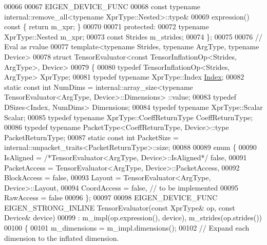 \begin{DoxyCode}
00066 
00067     EIGEN\_DEVICE\_FUNC
00068     \textcolor{keyword}{const} \textcolor{keyword}{typename} internal::remove\_all<typename XprType::Nested>::type&
00069     expression()\textcolor{keyword}{ const }\{ \textcolor{keywordflow}{return} m\_xpr; \}
00070 
00071   \textcolor{keyword}{protected}:
00072     \textcolor{keyword}{typename} XprType::Nested m\_xpr;
00073     \textcolor{keyword}{const} Strides m\_strides;
00074 \};
00075 
00076 \textcolor{comment}{// Eval as rvalue}
00077 \textcolor{keyword}{template}<\textcolor{keyword}{typename} Str\textcolor{keywordtype}{id}es, \textcolor{keyword}{typename} ArgType, \textcolor{keyword}{typename} Device>
00078 \textcolor{keyword}{struct }TensorEvaluator<const TensorInflationOp<Strides, ArgType>, Device>
00079 \{
00080   \textcolor{keyword}{typedef} TensorInflationOp<Strides, ArgType> XprType;
00081   \textcolor{keyword}{typedef} \textcolor{keyword}{typename} XprType::Index \hyperlink{namespace_eigen_a62e77e0933482dafde8fe197d9a2cfde}{Index};
00082   \textcolor{keyword}{static} \textcolor{keyword}{const} \textcolor{keywordtype}{int} NumDims = internal::array\_size<typename TensorEvaluator<ArgType, Device>::Dimensions>
      ::value;
00083   \textcolor{keyword}{typedef} DSizes<Index, NumDims> Dimensions;
00084   \textcolor{keyword}{typedef} \textcolor{keyword}{typename} XprType::Scalar Scalar;
00085   \textcolor{keyword}{typedef} \textcolor{keyword}{typename} XprType::CoeffReturnType CoeffReturnType;
00086   \textcolor{keyword}{typedef} \textcolor{keyword}{typename} PacketType<CoeffReturnType, Device>::type PacketReturnType;
00087   \textcolor{keyword}{static} \textcolor{keyword}{const} \textcolor{keywordtype}{int} PacketSize = internal::unpacket\_traits<PacketReturnType>::size;
00088 
00089   \textcolor{keyword}{enum} \{
00090     IsAligned = \textcolor{comment}{/*TensorEvaluator<ArgType, Device>::IsAligned*/} \textcolor{keyword}{false},
00091     PacketAccess = TensorEvaluator<ArgType, Device>::PacketAccess,
00092     BlockAccess = \textcolor{keyword}{false},
00093     Layout = TensorEvaluator<ArgType, Device>::Layout,
00094     CoordAccess = \textcolor{keyword}{false},  \textcolor{comment}{// to be implemented}
00095     RawAccess = \textcolor{keyword}{false}
00096   \};
00097 
00098   EIGEN\_DEVICE\_FUNC EIGEN\_STRONG\_INLINE TensorEvaluator(\textcolor{keyword}{const} XprType& op, \textcolor{keyword}{const} Device& device)
00099       : m\_impl(op.expression(), device), m\_strides(op.strides())
00100   \{
00101     m\_dimensions = m\_impl.dimensions();
00102     \textcolor{comment}{// Expand each dimension to the inflated dimension.}

\end{DoxyCode}
